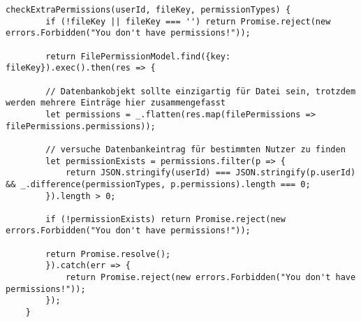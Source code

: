 \begin{lstlisting}[caption=checkExtraPermissions() Funktion des filePermissionHelper, label=code:fphextra]
	checkExtraPermissions(userId, fileKey, permissionTypes) {
		if (!fileKey || fileKey === '') return Promise.reject(new errors.Forbidden("You don't have permissions!"));
	
		return FilePermissionModel.find({key: fileKey}).exec().then(res => {
		
		// Datenbankobjekt sollte einzigartig für Datei sein, trotzdem werden mehrere Einträge hier zusammengefasst
		let permissions = _.flatten(res.map(filePermissions => filePermissions.permissions));
	
		// versuche Datenbankeintrag für bestimmten Nutzer zu finden
		let permissionExists = permissions.filter(p => {
			return JSON.stringify(userId) === JSON.stringify(p.userId) && _.difference(permissionTypes, p.permissions).length === 0;
		}).length > 0;
	
		if (!permissionExists) return Promise.reject(new errors.Forbidden("You don't have permissions!"));
	
		return Promise.resolve();
		}).catch(err => {
			return Promise.reject(new errors.Forbidden("You don't have permissions!"));
		});
	}
\end{lstlisting}
\clearpage